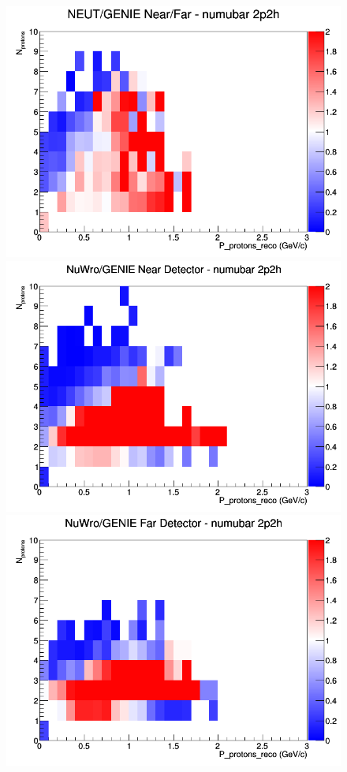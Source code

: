 \documentclass[12pt]{article}
\begin{document}
\begin{figure}[h]
\endminipage
{}
\includegraphics[width=\linewidth]{eff_N_P/GAr/protons/ratios/2p2h_NEUT_GENIE_numubar_NF_N_P.png}
\endminipage
\newline
{}
\includegraphics[width=\linewidth]{eff_N_P/GAr/protons/ratios/2p2h_NuWro_GENIE_numubar_near_N_P.png}
\endminipage
{}
\includegraphics[width=\linewidth]{eff_N_P/GAr/protons/ratios/2p2h_NuWro_GENIE_numubar_far_N_P.png}

\end{figure}
\end{document}
